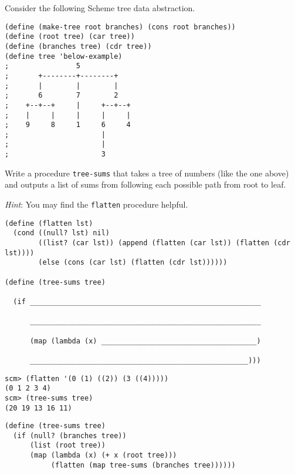 \question Consider the following Scheme tree data abstraction.

\begin{lstlisting}
(define (make-tree root branches) (cons root branches))
(define (root tree) (car tree))
(define (branches tree) (cdr tree))
(define tree 'below-example)
;                5
;       +--------+--------+
;       |        |        |
;       6        7        2
;    +--+--+     |     +--+--+
;    |     |     |     |     |
;    9     8     1     6     4
;                      |
;                      |
;                      3
\end{lstlisting}

Write a procedure \texttt{tree-sums} that takes a tree of numbers (like the one
above) and outputs a list of sums from following each possible path from root to
leaf.

\textit{Hint}: You may find the \texttt{flatten} procedure helpful.

\begin{lstlisting}
(define (flatten lst)
  (cond ((null? lst) nil)
        ((list? (car lst)) (append (flatten (car lst)) (flatten (cdr lst))))
        (else (cons (car lst) (flatten (cdr lst))))))

(define (tree-sums tree)

  (if _______________________________________________________

      _______________________________________________________

      (map (lambda (x) _____________________________________)

      ____________________________________________________)))
\end{lstlisting}

\vfill

\begin{lstlisting}
scm> (flatten '(0 (1) ((2)) (3 ((4)))))
(0 1 2 3 4)
scm> (tree-sums tree)
(20 19 13 16 11)
\end{lstlisting}

\begin{solution}
\begin{lstlisting}
(define (tree-sums tree)
  (if (null? (branches tree))
      (list (root tree))
      (map (lambda (x) (+ x (root tree)))
           (flatten (map tree-sums (branches tree))))))
\end{lstlisting}
\end{solution}

\clearpage
